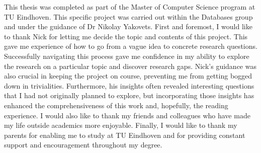 This thesis was completed as part of the Master of Computer Science
program at TU Eindhoven. This specific project was carried out within the
Databases group and under the guidance of Dr Nikolay Yakovets. First and
foremost, I would like to thank Nick for letting me decide the topic and
contents of this project. This gave me experience of how to go from a
vague idea to concrete research questions. Successfully navigating this process gave me
confidence in my ability to explore the research on a particular topic and
discover research gaps. Nick's guidance was also crucial in keeping the project
on course, preventing me from getting bogged down in trivialities. Furthermore, 
his insights often revealed interesting
questions that I had not originally planned to explore, but incorporating those
insights has enhanced the comprehensiveness of this work and, hopefully, the
reading experience. I would also like to thank my friends and colleagues who have
made my life outside academics more enjoyable. Finally, I would like to thank my
parents for enabling me to study at TU Eindhoven and for providing
constant support and encouragement throughout my degree.

